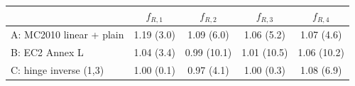 \begin{tabular}{l cccc}
\toprule
 & $f_{R,1}$ & $f_{R,2}$ & $f_{R,3}$ & $f_{R,4}$\\
\midrule
A: MC2010 linear + plain & 1.19 (3.0) & 1.09 (6.0) & 1.06 (5.2) & 1.07 (4.6)\\
B: EC2 Annex L & 1.04 (3.4) & 0.99 (10.1) & 1.01 (10.5) & 1.06 (10.2)\\
C: hinge inverse (1,3) & 1.00 (0.1) & 0.97 (4.1) & 1.00 (0.3) & 1.08 (6.9)\\
\bottomrule
\end{tabular}
